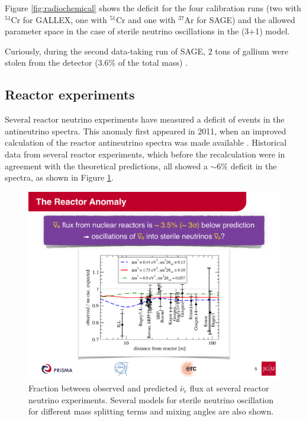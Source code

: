 Figure \ref{fig:radiochemical} shows the deficit for the four calibration runs (two with $^{51}$Cr for GALLEX, one with $^{51}$Cr and one with $^{37}$Ar for SAGE) and the allowed parameter space in the case of sterile neutrino oscillations in the (3+1) model.

Curiously, during the second data-taking run of SAGE, 2 tons of gallium were stolen from the detector (3.6\% of the total mass) \cite{Abdurashitov:1999zd}.
    
\subsection{Reactor experiments} 
Several reactor neutrino experiments have measured a deficit of events in the antineutrino spectra. This anomaly first appeared in 2011, when an improved calculation of the reactor antineutrino spectra was made available \cite{Mueller:2011nm}. Historical data from several reactor experiments, which before the recalculation were in agreement with the theoretical predictions, all showed a $\sim6\%$ deficit in the spectra, as shown in Figure \ref{fig:reactor}. 
    
    \begin{figure}[htbp]
      \centering
      \includegraphics[width=0.75\linewidth]{figures/reactor.pdf}
      \caption{Fraction between observed and predicted $\bar{\nu}_{e}$ flux at several reactor neutrino experiments. Several models for sterile neutrino oscillation for different mass splitting terms and mixing angles are also shown.}
    \label{fig:reactor}
    \end{figure}
    
